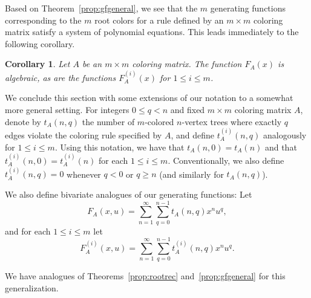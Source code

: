 \documentclass[12pt]{amsart}
\newtheorem{corollary}{Corollary}
\newcommand{\gfll}[1]{F_{#1}(x)}
\newcommand{\gfall}{\gfll{A}}
\newcommand{\gff}[2]{F_{#2}^{(#1)}(x)}
\newcommand{\gfa}[1]{\gff{#1}{A}}
\begin{document}
Based on Theorem~\ref{prop:gfgeneral}, we see that the $m$ generating functions corresponding to the $m$ root colors for a rule defined by an $m\times m$ coloring matrix satisfy a system of polynomial equations. This leads immediately to the following corollary.
\begin{corollary}\label{cor:algebraicgf}
    Let $A$ be an $m\times m$ coloring matrix. The function $\gfall$ is algebraic, as are the functions $\gfa{i}$ for $1\leq i\leq m$.
\end{corollary}

We conclude this section with some extensions of our notation to a somewhat more general setting. For integers $0\leq q<n$ and fixed $m\times m$ coloring matrix $A$, denote by $t_A(n,q)$ the number of $m$-colored $n$-vertex trees where exactly $q$ edges violate the coloring rule specified by $A$, and define $t_A^{(i)}(n,q)$ analogously for $1\leq i\leq m$. Using this notation, we have that $t_A(n,0)=t_A(n)$ and that $t_A^{(i)}(n,0)=t_A^{(i)}(n)$ for each $1\leq i\leq m$. Conventionally, we also define $t_A^{(i)}(n,q)=0$ whenever $q<0$ or $q\geq n$ (and similarly for $t_A(n,q)$).

We also define bivariate analogues of our generating functions: Let
\[
F_A(x,u)=\sum_{n=1}^\infty\sum_{q=0}^{n-1}t_A(n,q)x^nu^q,
\]
and for each $1\leq i\leq m$ let
\[
F_A^{(i)}(x,u)=\sum_{n=1}^\infty\sum_{q=0}^{n-1}t_A^{(i)}(n,q)x^nu^q.
\]

We have analogues of Theorems~\ref{prop:rootrec} and~\ref{prop:gfgeneral} for this generalization.
\end{document}

